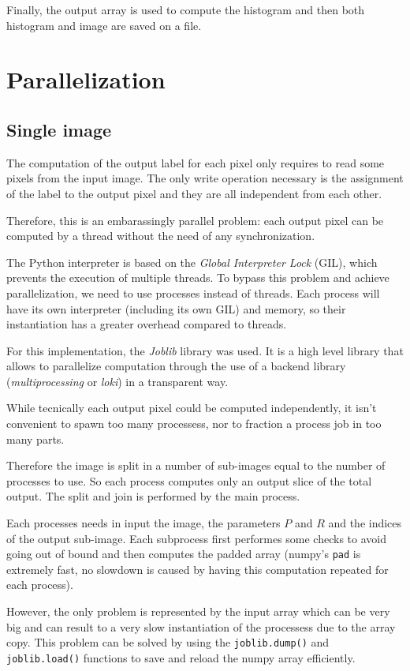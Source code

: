 \documentclass[10pt,twocolumn,letterpaper]{article}
\begin{document}
Finally, the output array is used to compute the histogram and then both histogram and image are saved on a file. 

\section{Parallelization}

\subsection{Single image}

The computation of the output label for each pixel only requires to read some pixels from the input image. The only write operation necessary is the assignment of the label to the output pixel and they are all independent from each other. 

Therefore, this is an embarassingly parallel problem: each output pixel can be computed by a thread without the need of any synchronization.

The Python interpreter is based on the \textit{Global Interpreter Lock} (GIL), which prevents the execution of multiple threads. To bypass this problem and achieve parallelization, we need to use processes instead of threads.
Each process will have its own interpreter (including its own GIL) and  memory, so their instantiation has a greater overhead compared to threads.

For this implementation, the \textit{Joblib} library was used. It is a high level library that allows to parallelize computation through the use of a backend library (\textit{multiprocessing} or \textit{loki}) in a transparent way.

While tecnically each output pixel could be computed independently, it isn't convenient to spawn too many processess, nor to fraction a process job in too many parts. 

Therefore the image is split in a number of sub-images equal to the number of processes to use. So each process computes only an output slice of the total output. The split and join is performed by the main process.

Each processes needs in input the image, the parameters $P$ and $R$ and the indices of the output sub-image. Each subprocess first performes some checks to avoid going out of bound and then computes the padded array (numpy's \verb"pad" is extremely fast, no slowdown is caused by having this computation repeated for each process).

However, the only problem is represented by the input array which can be very big and can result to a very slow instantiation of the processess due to the array copy. This problem can be solved by using the \verb"joblib.dump()" and \verb"joblib.load()" functions to save and reload the numpy array efficiently. 
\end{document}
